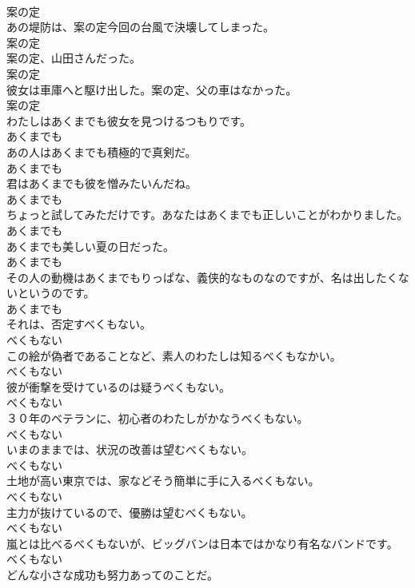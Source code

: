 \documentclass[8pt]{extreport}
\begin{document}
\begin{CJK}{UTF8}{min}
\\	案の定
\\	あの堤防は、案の定今回の台風で決壊してしまった。	
\\	案の定
\\	案の定、山田さんだった。	
\\	案の定
\\	彼女は車庫へと駆け出した。案の定、父の車はなかった。	
\\	案の定
\\	わたしはあくまでも彼女を見つけるつもりです。	
\\	あくまでも
\\	あの人はあくまでも積極的で真剣だ。	
\\	あくまでも
\\	君はあくまでも彼を憎みたいんだね。	
\\	あくまでも
\\	ちょっと試してみただけです。あなたはあくまでも正しいことがわかりました。	
\\	あくまでも
\\	あくまでも美しい夏の日だった。	
\\	あくまでも
\\	その人の動機はあくまでもりっぱな、義侠的なものなのですが、名は出したくないというのです。	
\\	あくまでも
\\	それは、否定すべくもない。	
\\	べくもない
\\	この絵が偽者であることなど、素人のわたしは知るべくもなかい。	
\\	べくもない
\\	彼が衝撃を受けているのは疑うべくもない。	
\\	べくもない
\\	３０年のベテランに、初心者のわたしがかなうべくもない。	
\\	べくもない
\\	いまのままでは、状況の改善は望むべくもない。	
\\	べくもない
\\	土地が高い東京では、家などそう簡単に手に入るべくもない。	
\\	べくもない
\\	主力が抜けているので、優勝は望むべくもない。	
\\	べくもない
\\	嵐とは比べるべくもないが、ビッグバンは日本ではかなり有名なバンドです。	
\\	べくもない
\\	どんな小さな成功も努力あってのことだ。	

\end{CJK}
\end{document}
